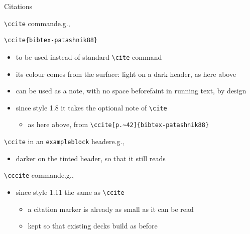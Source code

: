 \documentclass[presentation,cesena,apice]{beamer}\mode<presentation>{\usetheme{AMSBolognaFC}}
\begin{document}
\begin{frame}{Citations}
%
\begin{block}{\texttt{\textbackslash{}ccite} command\textemdash{}e.g., }
\begin{verbatim}
\ccite{bibtex-patashnik88}
\end{verbatim}
\begin{itemize}
	\item to be used instead of standard \texttt{\textbackslash{}cite} command
	\item its colour comes from the surface: light on a dark header, as here above
	\item can be used as a note, with no space before\textemdash{}faint in running text, by design
	\item since style 1.8 it takes the optional note of \texttt{\textbackslash{}cite}
	\begin{itemize}
		\item as here above, from \verb|\ccite[p.~42]{bibtex-patashnik88}|
	\end{itemize}
\end{itemize}
\end{block}
%
\begin{exampleblock}{\texttt{\textbackslash{}ccite} in an \texttt{exampleblock} header\textemdash{}e.g., }
\begin{itemize}
	\item darker on the tinted header, so that it still reads
\end{itemize}
\end{exampleblock}
%
\begin{alertblock}{\texttt{\textbackslash{}cccite} command\textemdash{}e.g., }
\begin{itemize}
	\item since style 1.11 the same as \texttt{\textbackslash{}ccite}
	\begin{itemize}
		\item a citation marker is already as small as it can be read
		\item kept so that existing decks build as before
	\end{itemize}
\end{itemize}
\end{alertblock}
%
\end{frame}
\end{document}
